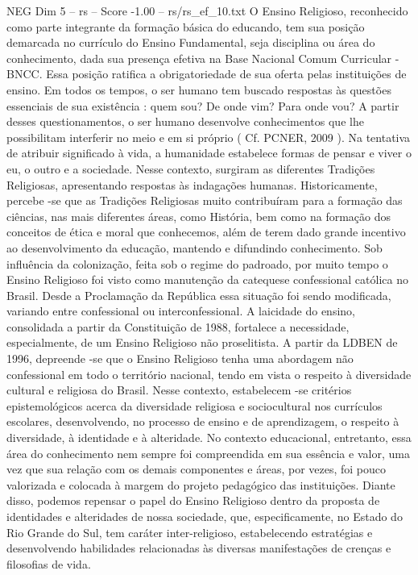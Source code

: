 \begin{textsample}{NEG Dim 5 – rs – Score -1.00 – rs/rs\_ef\_10.txt}  \label{ex:f5_neg_029}
O Ensino Religioso, reconhecido como parte integrante da formação básica do educando, tem sua posição demarcada no currículo do Ensino Fundamental, seja disciplina ou área do conhecimento, dada sua presença efetiva na Base Nacional Comum Curricular - BNCC.
Essa posição ratifica a obrigatoriedade de sua oferta pelas instituições de ensino.
Em todos os tempos, o ser humano tem buscado respostas às questões essenciais de sua existência : quem sou?
De onde vim?
Para onde vou?
A partir desses questionamentos, o ser humano desenvolve conhecimentos que lhe possibilitam interferir no meio e em si próprio ( Cf.
PCNER, 2009 ).
Na tentativa de atribuir significado à vida, a humanidade estabelece formas de pensar e viver o eu, o outro e a sociedade.
Nesse contexto, surgiram as diferentes Tradições Religiosas, apresentando respostas às indagações humanas.
Historicamente, percebe -se que as Tradições Religiosas muito contribuíram para a formação das ciências, nas mais diferentes áreas, como História, bem como na formação dos conceitos de ética e moral que conhecemos, além de terem dado grande incentivo ao desenvolvimento da educação, mantendo e difundindo conhecimento.
Sob influência da colonização, feita sob o regime do padroado, por muito tempo o Ensino Religioso foi visto como manutenção da catequese confessional católica no Brasil.
Desde a Proclamação da República essa situação foi sendo modificada, variando entre confessional ou interconfessional.
A laicidade do ensino, consolidada a partir da Constituição de 1988, fortalece a necessidade, especialmente, de um Ensino Religioso não proselitista.
A partir da LDBEN de 1996, depreende -se que o Ensino Religioso tenha uma abordagem não confessional em todo o território nacional, tendo em vista o respeito à diversidade cultural e religiosa do Brasil.
Nesse contexto, estabelecem -se critérios epistemológicos acerca da diversidade religiosa e sociocultural nos currículos escolares, desenvolvendo, no processo de ensino e de aprendizagem, o respeito à diversidade, à identidade e à alteridade.
No contexto educacional, entretanto, essa área do conhecimento nem sempre foi compreendida em sua essência e valor, uma vez que sua relação com os demais componentes e áreas, por vezes, foi pouco valorizada e colocada à margem do projeto pedagógico das instituições.
Diante disso, podemos repensar o papel do Ensino Religioso dentro da proposta de identidades e alteridades de nossa sociedade, que, especificamente, no Estado do Rio Grande do Sul, tem caráter inter-religioso, estabelecendo estratégias e desenvolvendo habilidades relacionadas às diversas manifestações de crenças e filosofias de vida.

\end{textsample}
